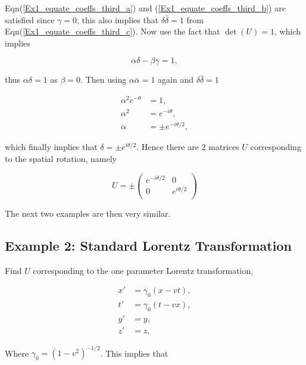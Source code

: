 \noindent Eqn(\ref{Ex1_equate_coeffs_third_a}) and (\ref{Ex1_equate_coeffs_third_b}) are satisfied since $\gamma = 0$, this also implies that $\delta \bar{\delta} = 1$ from Eqn(\ref{Ex1_equate_coeffs_third_c}). Now use the fact that $\det{(U)} = 1$, which implies

\begin{equation*}
\alpha \delta - \beta \gamma = 1,
\end{equation*}

\noindent thus $\alpha \delta = 1$ as $\beta = 0$. Then using $\alpha \bar{\alpha} = 1$ again and $\delta \bar{\delta} = 1$

\begin{align*}
\alpha^2 e^{-\theta} & = 1, \\
\alpha^2 & = e^{-i\theta}, \\
\alpha & = \pm e^{{-i\theta}/2}, 
\end{align*}

\noindent which finally implies that $\delta = \pm e^{i\theta/2}$. Hence there are 2 matrices $U$ corresponding to the spatial rotation, namely

\begin{equation*}
U = \pm
\left(
\begin{array}{cc}
e^{-i\theta/2} & 0            \\
0              & e^{i\theta/2} \\
\end{array}
\right)
\end{equation*}

\noindent The next two examples are then very similar.

\subsection{Example 2: Standard Lorentz Transformation}\label{Special_Linear_Matrices_Example_2}

\noindent Find $U$ corresponding to the one parameter Lorentz transformation,

\begin{align}
\nonumber 
x' & = \gamma_0 (x-vt), 
\\\nonumber
t' & = \gamma_0 (t-vx), 
\\\nonumber
y' & = y, 
\\\label{Special_Matrices_Standard_Lorentz}
z' & = z, 
\end{align} 

\noindent Where $\gamma_0 = (1-v^2)^{-1/2}$.  This implies that

